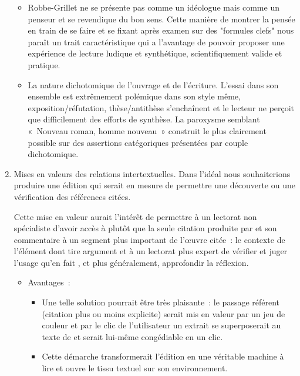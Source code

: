 \documentclass[12pt, a4paper]{article}
\begin{document}
\begin{enumerate}
        \begin{itemize}
            \item Robbe-Grillet ne se présente pas comme un idéologue mais comme un penseur et se revendique du bon sens. Cette manière de montrer la pensée en train de se faire et se fixant après examen sur des "formules clefs" nous paraît un trait caractéristique qui a l'avantage de pouvoir proposer une expérience de lecture ludique et synthétique, scientifiquement valide et pratique.
            \item La nature dichotomique de l'ouvrage et de l'écriture. L'essai dans son ensemble est extrêmement polémique dans son style même, exposition/réfutation, thèse/antithèse s'enchaînent et le lecteur ne perçoit que difficilement des efforts de synthèse. La paroxysme semblant «~Nouveau roman, homme nouveau~» construit le plus clairement possible sur des assertions catégoriques présentées par couple dichotomique.
        \end{itemize}
    \item Mises en valeurs des relations intertextuelles.
    Dans l'idéal nous souhaiterions produire une édition qui serait en mesure de permettre une découverte ou une vérification des références citées.

    Cette mise en valeur aurait l'intérêt de permettre à un lectorat non spécialiste d'avoir accès à plutôt que la seule citation produite par \robbe{} et son commentaire à un segment plus important de l'œuvre citée~: le contexte de l'élément dont \robbe{} tire argument et à un lectorat plus expert de vérifier et juger l'usage qu'en fait \robbe{}, et plus généralement, approfondir la réflexion.
        \begin{itemize}
            \item Avantages~:
            \begin{itemize}
                \item Une telle solution pourrait être très plaisante~: le passage référent (citation plus ou moins explicite) serait mis en valeur par un jeu de couleur et par le clic de l'utilisateur un extrait se superposerait au texte de \punr{} et serait lui-même congédiable en un clic.
                \item Cette démarche transformerait l'édition en une véritable machine à lire et ouvre le tissu textuel sur son environnement.
            \end{itemize}
            

\end{itemize}
\end{enumerate}
\end{document}
